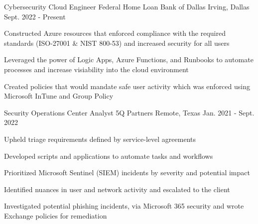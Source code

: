 \begin{cventries}
\cventry
  {Cybersecurity Cloud Engineer} %
  {Federal Home Loan Bank of Dallas} %
  {Irving, Dallas} %
  {Sept. 2022 - Present} %
  {
    \begin{cvitems}
      \item{Constructed Azure resources that enforced compliance with the required standards (ISO-27001 \& NIST 800-53) and increased security for all users}
      \item{Leveraged the power of Logic Apps, Azure Functions, and Runbooks to automate processes and increase visiability into the cloud environment}
      \item{Created policies that would mandate safe user activity which was enforced using Microsoft InTune and Group Policy}
    \end{cvitems}
  }
\cventry
  {Security Operations Center Analyst} %
  {5Q Partners} %
  {Remote, Texas} %
  {Jan. 2021 - Sept. 2022} %
  {
    \begin{cvitems}
      \item {Upheld triage requirements defined by service-level agreements}
      \item {Developed scripts and applications to automate tasks and workflows}
      \item {Prioritized Microsoft Sentinel (SIEM) incidents by severity and potential impact}
      \item {Identified nuances in user and network activity and escalated to the client}
      \item {Investigated potential phishing incidents, via Microsoft 365 security and wrote Exchange policies for remediation}

\end{cvitems}}
\end{cventries}

